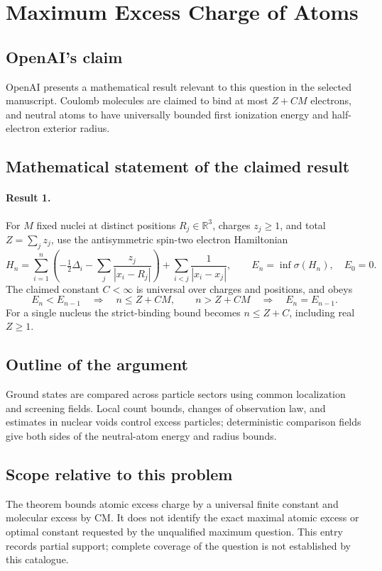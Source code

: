 \documentclass[11pt]{article}
\begin{document}
\section*{Maximum Excess Charge of Atoms}

\subsection{OpenAI's claim}
OpenAI presents a mathematical result relevant to this question in the selected manuscript. Coulomb molecules are claimed to bind at most $Z+CM$ electrons, and neutral atoms to have universally bounded first ionization energy and half-electron exterior radius.

\subsection{Mathematical statement of the claimed result}
\paragraph{Result 1.} For \(M\) fixed nuclei at distinct positions \(R_j\in\mathbb R^3\), charges \(z_j\ge1\), and total \(Z=\sum_jz_j\), use the antisymmetric spin-two electron Hamiltonian
\[
 H_n=\sum_{i=1}^n\left(-\tfrac12\Delta_i-\sum_j\frac{z_j}{|x_i-R_j|}\right)
 +\sum_{i<j}\frac1{|x_i-x_j|},\qquad E_n=\inf\sigma(H_n),\quad E_0=0.
\]
The claimed constant \(C<\infty\) is universal over charges and positions, and obeys
\[
 E_n<E_{n-1}\quad\Longrightarrow\quad n\le Z+CM,
 \qquad n>Z+CM\quad\Longrightarrow\quad E_n=E_{n-1}.
\]
For a single nucleus the strict-binding bound becomes \(n\le Z+C\), including real \(Z\ge1\).

\subsection{Outline of the argument}
Ground states are compared across particle sectors using common localization and screening fields. Local count bounds, changes of observation law, and estimates in nuclear voids control excess particles; deterministic comparison fields give both sides of the neutral-atom energy and radius bounds.

\subsection{Scope relative to this problem}
The theorem bounds atomic excess charge by a universal finite constant and molecular excess by CM. It does not identify the exact maximal atomic excess or optimal constant requested by the unqualified maximum question. This entry records partial support; complete coverage of the question is not established by this catalogue.
\end{document}
